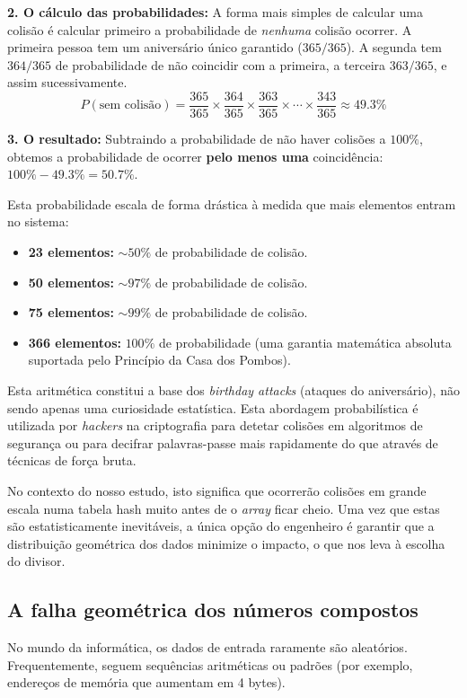 \documentclass[12pt, a4paper]{article}
\begin{document}
\textbf{2. O cálculo das probabilidades:} A forma mais simples de calcular uma colisão é calcular primeiro a probabilidade de \textit{nenhuma} colisão ocorrer. 
A primeira pessoa tem um aniversário único garantido ($365/365$). A segunda tem $364/365$ de probabilidade de não coincidir com a primeira, a terceira $363/365$, 
e assim sucessivamente.
\begin{equation}
    P(\text{sem colisão}) = \frac{365}{365} \times \frac{364}{365} \times \frac{363}{365} \times \cdots \times \frac{343}{365} \approx 49.3\%
\end{equation}

\textbf{3. O resultado:} Subtraindo a probabilidade de não haver colisões a $100\%$, 
obtemos a probabilidade de ocorrer \textbf{pelo menos uma} 
coincidência: $100\% - 49.3\% = 50.7\%$.

Esta probabilidade escala de forma drástica à medida que mais elementos entram no sistema:
\begin{itemize}
    \item \textbf{23 elementos:} $\sim 50\%$ de probabilidade de colisão.
    \item \textbf{50 elementos:} $\sim 97\%$ de probabilidade de colisão.
    \item \textbf{75 elementos:} $\sim 99\%$ de probabilidade de colisão.
    \item \textbf{366 elementos:} $100\%$ de probabilidade (uma garantia matemática absoluta suportada pelo Princípio da Casa dos Pombos).
\end{itemize}

Esta aritmética constitui a base dos \textit{birthday attacks} (ataques do aniversário), 
não sendo apenas uma curiosidade estatística. Esta abordagem probabilística é utilizada por \textit{hackers} na criptografia para detetar 
colisões em algoritmos de segurança ou para decifrar palavras-passe mais rapidamente do que através de técnicas de força bruta.

No contexto do nosso estudo, isto significa que ocorrerão colisões em grande escala numa tabela hash muito antes de o \textit{array} ficar cheio. 
Uma vez que estas são estatisticamente inevitáveis, a única opção do engenheiro é garantir que a distribuição geométrica dos dados minimize o impacto, 
o que nos leva à escolha do divisor.

\subsection{A falha geométrica dos números compostos}
No mundo da informática, os dados de entrada raramente são aleatórios. Frequentemente, 
seguem sequências aritméticas ou padrões (por exemplo, endereços de memória que aumentam em 4 bytes).
\end{document}
